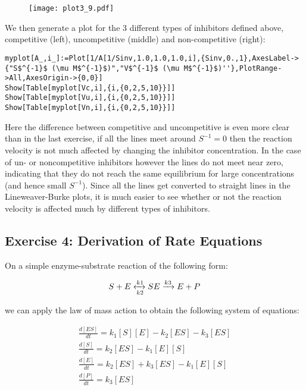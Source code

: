 \documentclass[11pt,a4paper,onecolumn]{article}
\begin{document}
\begin{figure}[H]
  \centering
  \texttt{[image: plot3\_9.pdf]}
\end{figure}

We then generate a plot for the 3 different types of inhibitors defined above, competitive (left), uncompetitive (middle) and non-competitive (right):

\begin{lstlisting}[mathescape]
myplot[A_,i_]:=Plot[1/A[1/Sinv,1.0,1.0,1.0,i],{Sinv,0.,1},AxesLabel->{"S$^{-1}$ (\mu M$^{-1}$)","V$^{-1}$ (\mu M$^{-1}$)''},PlotRange->All,AxesOrigin->{0,0}]
Show[Table[myplot[Vc,i],{i,{0,2,5,10}}]]
Show[Table[myplot[Vu,i],{i,{0,2,5,10}}]]
Show[Table[myplot[Vn,i],{i,{0,2,5,10}}]] 
\end{lstlisting}

\begin{figure}[H]
  \centering
\end{figure}

Here the difference between competitive and uncompetitive is even more clear than in the last exercise, if all the lines meet around $S^{-1} = 0$ then the reaction velocity is not much affected by changing the inhibitor concentration. In the case of un- or noncompetitive inhibitors however the lines do not meet near zero, indicating that they do not reach the same equilibrium for large concentrations (and hence small $S^{-1}$). Since all the lines get converted to straight lines in the Lineweaver-Burke plots, it is much easier to see whether or not the reaction velocity is affected much by different types of inhibitors.

\subsection{Exercise 4: Derivation of Rate Equations}
On a simple enzyme-substrate reaction of the following form:

\begin{equation*}
  S + E \xleftrightarrow[k2]{k1} SE \xrightarrow{k3} E + P
\end{equation*}

we can apply the law of mass action to obtain the following system of equations:

\begin{align*}
  \frac{d[ES]}{dt} = k_1 [S][E] - k_2 [ES] - k_3 [ES] \nonumber \\
  \frac{d[S]}{dt} = k_2 [ES] - k_1 [E][S] \nonumber \\
  \frac{d[E]}{dt} = k_2 [ES] + k_3 [ES] - k_1 [E][S] \nonumber \\
  \frac{d[P]}{dt} = k_3 [ES]
\end{align*}
\end{document}
